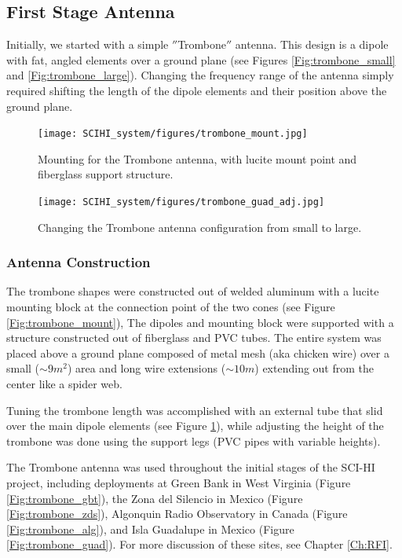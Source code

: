 \subsection{First Stage Antenna}
Initially, we started with a simple $''$Trombone$''$ antenna. This design is a dipole with fat, angled elements over a ground plane (see Figures \ref{Fig:trombone_small} and \ref{Fig:trombone_large}). Changing the frequency range of the antenna simply required shifting the length of the dipole elements and their position above the ground plane. 

\begin{figure}[htb]
\centering
\begin{minipage}[b]{0.53\textwidth}
\centering
\texttt{[image: SCIHI\_system/figures/trombone\_mount.jpg]}
\caption{Mounting for the Trombone antenna, with lucite mount point and fiberglass support structure. }
\label{Fig:trombone_mount}
\end{minipage}%
\begin{minipage}[b]{0.02\textwidth}
\hspace{1cm}
\end{minipage}%
\begin{minipage}[b]{0.41\textwidth}
\centering
\texttt{[image: SCIHI\_system/figures/trombone\_guad\_adj.jpg]}
\caption{Changing the Trombone antenna configuration from small to large.}
\label{Fig:trombone_adj}
\end{minipage}
\end{figure}

\subsubsection{Antenna Construction}
The trombone shapes were constructed out of welded aluminum with a lucite mounting block at the connection point of the two cones (see Figure \ref{Fig:trombone_mount}), The dipoles and mounting block were supported with a structure constructed out of fiberglass and PVC tubes. The entire system was placed above a ground plane composed of metal mesh (aka chicken wire) over a small ($\sim9 m^2$) area and long wire extensions ($\sim10 m$) extending out from the center like a spider web. 

Tuning the trombone length was accomplished with an external tube that slid over the main dipole elements (see Figure \ref{Fig:trombone_adj}), while adjusting the height of the trombone was done using the support legs (PVC pipes with variable heights).

The Trombone antenna was used throughout the initial stages of the SCI-HI project, including deployments at Green Bank in West Virginia (Figure \ref{Fig:trombone_gbt}), the Zona del Silencio in Mexico (Figure \ref{Fig:trombone_zds}), Algonquin Radio Observatory in Canada (Figure \ref{Fig:trombone_alg}), and Isla Guadalupe in Mexico (Figure \ref{Fig:trombone_guad}). For more discussion of these sites, see Chapter \ref{Ch:RFI}.

